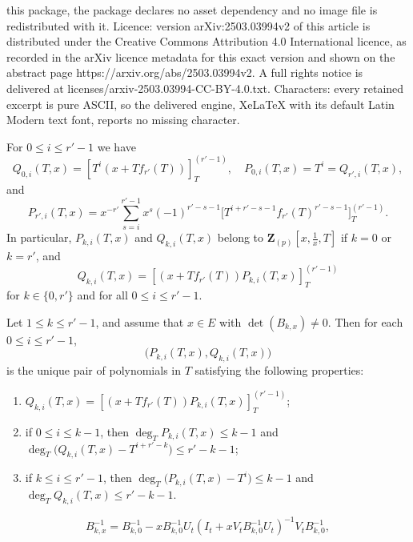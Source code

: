 \documentclass[10pt,a4paper]{amsart}
\newcommand{\Z}{\mathbf{Z}}
\begin{document}
this package, the package declares no asset dependency and no image file is redistributed with it. Licence: version arXiv:2503.03994v2 of this article is distributed under the Creative Commons Attribution 4.0 International licence, as recorded in the arXiv licence metadata for this exact version and shown on the abstract page https://arxiv.org/abs/2503.03994v2. A full rights notice is delivered at licenses/arxiv-2503.03994-CC-BY-4.0.txt. Characters: every retained excerpt is pure ASCII, so the delivered engine, XeLaTeX with its default Latin Modern text font, reports no missing character.
\begin{lemm}\label{lemma: k=0,k=r}
For $0\leq i\leq r'-1$ we have
\begin{equation*}
   Q_{0,i}(T,x)=[T^i(x+Tf_{r'}(T))]_{T}^{(r'-1)},\quad  P_{0,i}(T,x)=T^i=Q_{r',i}(T,x),
\end{equation*}
and
\begin{equation*}
    P_{r',i}(T,x) =  x^{-r'}\sum_{s=i}^{r'-1}x^s (-1)^{r'-s-1}\Big[T^{i+r'-s-1}f_{r'}(T)^{r'-s-1}\Big]_{T}^{(r'-1)}.
\end{equation*}
In particular, $P_{k,i}(T,x)$ and $Q_{k,i}(T,x)$ belong to $\Z_{(p)}[x,\frac{1}{x},T]$ if $k=0$ or $k=r'$, and
$$Q_{k,i}(T,x)=[(x+Tf_{r'}(T))P_{k,i}(T,x)]_{T}^{(r'-1)}$$ for $k\in\{0,r'\}$ and for all $0\leq i\leq r'-1$.
\end{lemm}

\begin{lemm}\label{lemma: PQdegree}
Let $1\leq k\leq r'-1$, and assume that $x\in E$ with $\det (B_{k,x})\neq 0$. Then for each $0\leq i\leq r'-1$, $$\big(P_{k,i}(T,x),Q_{k,i}(T,x)\big)$$ is the unique pair of polynomials in $T$ satisfying the following properties:
    \begin{enumerate}[leftmargin=*]
        \item $Q_{k,i}(T,x)=[(x+Tf_{r'}(T))P_{k,i}(T,x)]_{T}^{(r'-1)}$;
        \item if $0\leq i\leq k-1$, then $\deg_T P_{k,i}(T,x)\leq k-1$ and $\deg_T\big( Q_{k,i}(T,x)-T^{i+r'-k} \big)\leq r'-k-1$;
        \item if $k\leq i\leq r'-1$, then $\deg_T\big( P_{k,i}(T,x)-T^i \big)\leq k-1$ and $\deg_T Q_{k,i}(T,x)\leq r'-k-1$.
    \end{enumerate}
\end{lemm}

\begin{equation}\label{eq: inverse of B_k,x}
    B_{k,x}^{-1}=B_{k,0}^{-1}-xB_{k,0}^{-1}U_t(I_t+xV_tB_{k,0}^{-1}U_t)^{-1}V_tB_{k,0}^{-1},
\end{equation}
\end{document}
